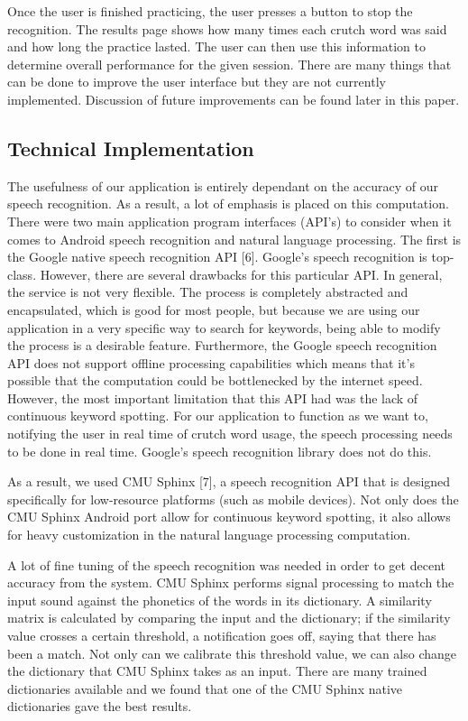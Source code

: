 \documentclass{sigchi}
\begin{document}
Once the user is finished practicing, the user presses a button to stop the recognition. The results page shows how many times each crutch word was said and how long the practice lasted. The user can then use this information to determine overall performance for the given session. There are many things that can be done to improve the user interface but they are not currently implemented. Discussion of future improvements can be found later in this paper.

\subsection{Technical Implementation}

The usefulness of our application is entirely dependant on the accuracy of our speech recognition. As a result, a lot of emphasis is placed on this computation. There were two main application program interfaces (API’s) to consider when it comes to Android speech recognition and natural language processing. The first is the Google native speech recognition API [6]. Google’s speech recognition is top-class. However, there are several drawbacks for this particular API. In general, the service is not very flexible. The process is completely abstracted and encapsulated, which is good for most people, but because we are using our application in a very specific way to search for keywords, being able to modify the process is a desirable feature. Furthermore, the Google speech recognition API does not support offline processing capabilities which means that it’s possible that the computation could be bottlenecked by the internet speed. However, the most important limitation that this API had was the lack of continuous keyword spotting. For our application to function as we want to, notifying the user in real time of crutch word usage, the speech processing needs to be done in real time. Google’s speech recognition library does not do this. 

As a result, we used CMU Sphinx [7], a speech recognition API that is designed specifically for low-resource platforms (such as mobile devices). Not only does the CMU Sphinx Android port allow for continuous keyword spotting, it also allows for heavy customization in the natural language processing computation. 

A lot of fine tuning of the speech recognition was needed in order to get decent accuracy from the system. CMU Sphinx performs signal processing to match the input sound against the phonetics of the words in its dictionary. A similarity matrix is calculated by comparing the input and the dictionary; if the similarity value crosses a certain threshold, a notification goes off, saying that there has been a match. Not only can we calibrate this threshold value, we can also change the dictionary that CMU Sphinx takes as an input. There are many trained dictionaries available and we found that one of the CMU Sphinx native dictionaries gave the best results.
\end{document}
